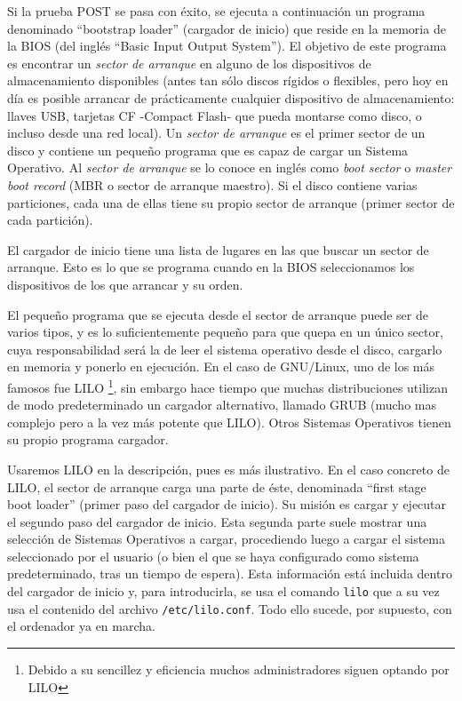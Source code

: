 \documentclass[12pt]{article}
\begin{document}
Si la prueba POST se pasa con éxito, se ejecuta a continuación un programa
denominado ``bootstrap loader'' (cargador de inicio) que reside en la memoria de la
BIOS (del inglés ``Basic Input Output System''). El objetivo de este programa 
es encontrar un \textit{sector de arranque} en alguno de
los dispositivos de almacenamiento disponibles (antes tan sólo discos rígidos o
flexibles, pero hoy en día es posible arrancar de prácticamente cualquier dispositivo
de almacenamiento: llaves USB, tarjetas CF -Compact Flash- que pueda
montarse como disco, o incluso desde una red local).
Un \textit{sector de arranque} es el primer sector de un disco y contiene un pequeño
programa  que es capaz de cargar un Sistema Operativo. Al \textit{sector de arranque} 
se lo conoce  en inglés como \textit{boot sector} o
\textit{master boot record} (MBR o sector de arranque maestro). Si
el disco contiene varias particiones, cada una de ellas tiene su propio sector
de arranque (primer sector de cada partición).  

El cargador de inicio tiene una lista de lugares en las que buscar un sector de
arranque. Esto es lo que se programa cuando en la BIOS seleccionamos los dispositivos
de los que arrancar y su orden.

El pequeño programa que se ejecuta desde el sector de arranque puede ser de
varios tipos, y es lo suficientemente pequeño para que quepa en un único sector, 
cuya responsabilidad será la de leer el sistema operativo desde el disco, cargarlo 
en memoria y ponerlo en ejecución. En el caso de GNU/Linux, uno de los más famosos fue LILO
\footnote{Debido a su sencillez y eficiencia muchos administradores siguen 
optando por LILO}, sin embargo 
hace tiempo que muchas distribuciones utilizan de modo predeterminado un cargador alternativo,
llamado GRUB (mucho mas complejo pero a la vez más potente que LILO). Otros Sistemas Operativos 
tienen su propio programa cargador.

Usaremos LILO en la descripción, pues es más ilustrativo.
En el caso concreto de LILO, el sector de arranque carga una parte
de éste, denominada ``first stage boot loader'' (primer paso del cargador de inicio).
Su misión es cargar y ejecutar el segundo paso del cargador de inicio.
Esta segunda parte suele mostrar una selección de Sistemas Operativos a cargar,
procediendo luego a cargar el sistema seleccionado por el usuario (o bien el
que se haya configurado como sistema predeterminado, tras un tiempo de espera). 
Esta información está incluida dentro del cargador de inicio
y, para introducirla, se usa el comando \texttt{lilo} que a su vez usa el contenido del
archivo \texttt{/etc/lilo.conf}. Todo ello sucede, por supuesto, con el ordenador ya en marcha.
\end{document}
